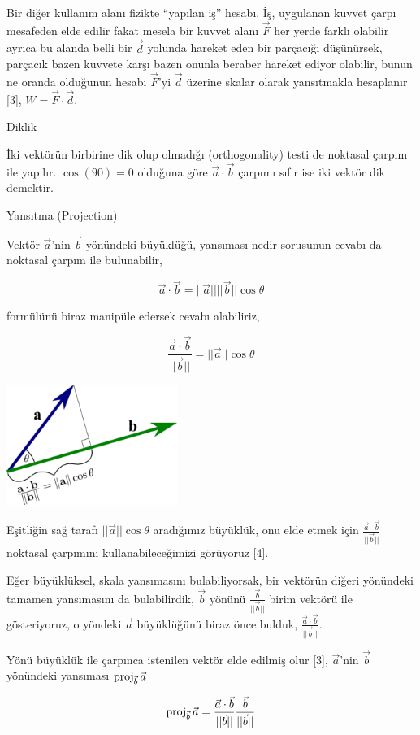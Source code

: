 \documentclass[12pt,fleqn]{article}\usepackage{../../common}
\begin{document}
Bir diğer kullanım alanı fizikte ``yapılan iş'' hesabı. İş, uygulanan kuvvet
çarpı mesafeden elde edilir fakat mesela bir kuvvet alanı $\vec{F}$ her yerde
farklı olabilir ayrıca bu alanda belli bir $\vec{d}$ yolunda hareket eden bir
parçacığı düşünürsek, parçacık bazen kuvvete karşı bazen onunla beraber hareket
ediyor olabilir, bunun ne oranda olduğunun hesabı $\vec{F}$'yi $\vec{d}$ üzerine
skalar olarak yansıtmakla hesaplanır [3], $W = \vec{F} \cdot \vec{d}$.

Diklik

İki vektörün birbirine dik olup olmadığı (orthogonality) testi de noktasal
çarpım ile yapılır. $\cos(90) = 0$ olduğuna göre $\vec{a}\cdot\vec{b}$ çarpımı
sıfır ise iki vektör dik demektir. 

Yansıtma (Projection)

Vektör $\vec{a}$'nin $\vec{b}$ yönündeki büyüklüğü, yansıması nedir sorusunun
cevabı da noktasal çarpım ile bulunabilir, 

$$
\vec{a}\cdot\vec{b} = ||\vec{a}||||\vec{b}||\cos\theta
$$

formülünü biraz manipüle edersek cevabı alabiliriz, 

$$
\frac{\vec{a}\cdot\vec{b}}{||\vec{b}||} = ||\vec{a}|| \cos \theta
$$

\includegraphics[width=15em]{dot_product_projection.png}

Eşitliğin sağ tarafı $||\vec{a}|| \cos \theta$ aradığımız büyüklük, onu elde
etmek için $\frac{\vec{a}\cdot\vec{b}}{||\vec{b}||}$ noktasal çarpımını
kullanabileceğimizi görüyoruz [4].

Eğer büyüklüksel, skala yansımasını bulabiliyorsak, bir vektörün diğeri
yönündeki tamamen yansımasını da bulabilirdik, $\vec{b}$ yönünü
$\frac{\vec{b}}{||\vec{b}||}$ birim vektörü ile gösteriyoruz, o yöndeki
$\vec{a}$ büyüklüğünü biraz önce bulduk, $\frac{\vec{a}\cdot\vec{b}}{||\vec{b}||}$.

Yönü büyüklük ile çarpınca istenilen vektör elde edilmiş olur [3], $\vec{a}$'nin
$\vec{b}$ yönündeki yansıması $\operatorname{proj}_{\vec{b}} \vec{a}$

$$
\operatorname{proj}_{\vec{b}} \vec{a} = \frac{\vec{a}\cdot\vec{b}}{||\vec{b}||} \frac{\vec{b}}{||\vec{b}||}
$$
\end{document}
